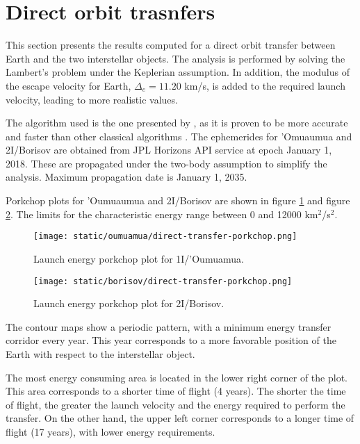 \section{Direct orbit trasnfers}

This section presents the results computed for a direct orbit transfer between
Earth and the two interstellar objects. The analysis is performed by solving the
Lambert's problem under the Keplerian assumption. In addition, the modulus of
the escape velocity for Earth, $\Delta_e = 11.20$ km/s, is added to the required
launch velocity, leading to more realistic values.

The algorithm used is the one presented by \cite{izzo2015}, as it is proven to
be more accurate and faster than other classical algorithms \cite{martinez2021}.
The ephemerides for 'Omuaumua and 2I/Borisov are obtained from JPL Horizons API
service at epoch January 1, 2018. These are propagated under the two-body
assumption to simplify the analysis. Maximum propagation date is January 1,
2035.

Porkchop plots for 'Oumuaumua and 2I/Borisov are shown in figure
\ref{fig:oumuamua-direct-transfer-porkchop} and figure
\ref{fig:borisov-direct-transfer-porkchop}. The limits for the characteristic
energy range between 0 and 12000 km$^2$/s$^2$.

\begin{figure}[H]
  \centering
  \texttt{[image: static/oumuamua/direct-transfer-porkchop.png]}
  \caption{Launch energy porkchop plot for 1I/'Oumuamua.}
  \label{fig:oumuamua-direct-transfer-porkchop}
\end{figure}
\begin{figure}[H]
  \centering
  \texttt{[image: static/borisov/direct-transfer-porkchop.png]}
  \caption{Launch energy porkchop plot for 2I/Borisov.}
  \label{fig:borisov-direct-transfer-porkchop}
\end{figure}

The contour maps show a periodic pattern, with a minimum energy transfer
corridor every year. This year corresponds to a more favorable position of the
Earth with respect to the interstellar object.

The most energy consuming area is located in the lower right corner of the plot.
This area corresponds to a shorter time of flight (4 years). The shorter the time of
flight, the greater the launch velocity and the energy required to perform the
transfer. On the other hand, the upper left corner corresponds to a longer time
of flight (17 years), with lower energy requirements.


